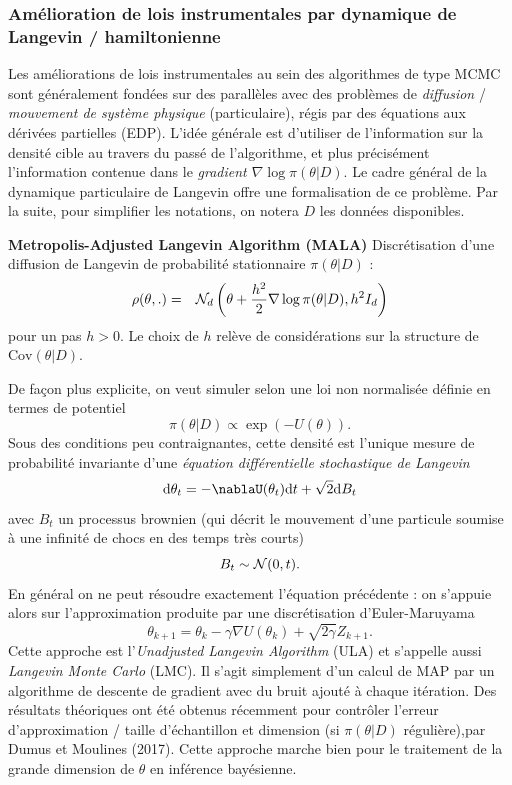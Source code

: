 \subsubsection{Amélioration de lois instrumentales par dynamique de Langevin / hamiltonienne}

Les améliorations de lois instrumentales au sein des algorithmes de type MCMC sont généralement fondées sur des parallèles avec des problèmes de \emph{diffusion} / \emph{mouvement de système physique}  (particulaire), régis par des équations aux dérivées partielles (EDP). L'idée générale est d'utiliser de l'information sur la densité cible au travers du passé de l'algorithme, et plus précisément l'information contenue dans le \emph{gradient $\nabla \log \pi(\theta|D)$}. Le cadre général de la dynamique particulaire de Langevin offre une formalisation de ce problème. Par la suite, pour simplifier les notations, on notera $D$ les données disponibles. \\

\begin{proposition}{\bf Metropolis-Adjusted Langevin Algorithm (MALA)}
Discrétisation d'une diffusion de Langevin de probabilité stationnaire $\pi(\theta|D)$ :
\begin{eqnarray*}
\rho(\theta,.) & = & {\cal{N}}_d\left(\theta + \frac{h^2}{2}\nabla \log \pi(\theta|D), h^2 I_d\right)
\end{eqnarray*}
pour un pas $h>0$. Le choix de $h$ relève de considérations sur la structure de $\mbox{Cov}(\theta|D)$.
\end{proposition}

De fa\c con plus explicite, on veut simuler selon une loi non normalisée définie en termes de potentiel
$$
\pi(\theta|D)  \propto  \exp\left(-U(\theta)\right).
$$
Sous des conditions peu contraignantes, cette densité est l'unique mesure de probabilité invariante d'une \emph{équation différentielle stochastique de Langevin}
$$
\mbox{d}\theta_t  =  -\nablaU(\theta_t) \mbox{d}t + \sqrt{2}\mbox{d} B_t
$$
avec $B_t$ un processus brownien (qui décrit le mouvement d'une particule soumise à une infinité de chocs en des temps très courts)
$$
B_t \sim {\cal{N}}(0,t). 
$$
 En général on ne peut résoudre exactement l'équation précédente : on s'appuie alors sur l'approximation produite par une discrétisation d'Euler-Maruyama
$$
\theta_{k+1} = \theta_k - \gamma\nabla U(\theta_k) +  \sqrt{2\gamma} Z_{k+1}.
$$
Cette approche est l'\emph{Unadjusted Langevin Algorithm} (ULA) et s'appelle aussi \emph{Langevin Monte Carlo} (LMC). Il s'agit simplement d'un calcul de MAP par un algorithme de descente de gradient avec du bruit ajouté à chaque itération.
Des résultats théoriques ont été obtenus récemment pour contrôler l'erreur d'approximation / taille d'échantillon et dimension (si $\pi(\theta|D)$ régulière),par Dumus et Moulines (2017). Cette approche marche bien pour le traitement de la grande dimension de $\theta$ en inférence bayésienne. \\

